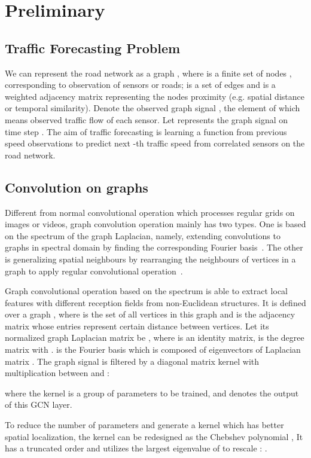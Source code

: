 \documentclass{article}
\begin{document}
\section{Preliminary}
\subsection{Traffic Forecasting Problem}
We can represent the road network as a graph , where  is a finite set of nodes , corresponding to observation of  sensors or roads;  is a set of edges and  is a weighted adjacency matrix representing the nodes proximity (e.g. spatial distance or temporal similarity). Denote the observed graph signal , the element of which means observed traffic flow of each sensor. Let  represents the graph signal on time step . The aim of traffic forecasting is learning a function  from previous  speed observations to predict next -th traffic speed from  correlated sensors on the road network. 

\subsection{Convolution on graphs}
Different from normal convolutional operation which processes regular grids on images or videos, graph convolution operation mainly has two types. One is based on the spectrum of the graph Laplacian, namely, extending convolutions to graphs in spectral domain by finding the corresponding Fourier basis~\cite{bruna2013spectral}. The other is generalizing spatial neighbours by rearranging the neighbours of vertices in a graph to apply regular convolutional operation~\cite{niepert2016learning}. 

Graph convolutional operation based on the spectrum is able to extract local features with different reception fields from non-Euclidean structures\cite{hammond2011wavelets}. It is defined over a graph , where  is the set of all vertices in this graph and  is the adjacency matrix whose entries represent certain distance between vertices. Let its normalized graph Laplacian matrix be , where  is an identity matrix,  is the degree matrix with .  is the Fourier basis which is composed of eigenvectors of Laplacian matrix . The graph signal  is filtered by a diagonal matrix kernel  with multiplication between  and :

where the kernel  is a group of parameters to be trained,  and  denotes the output of this GCN layer.

To reduce the number of parameters and generate a kernel which has better spatial localization, the kernel  can be redesigned as the Chebshev polynomial , It has a truncated order  and utilizes the largest eigenvalue of  to rescale :  \cite{defferrard2016convolutional}. 
\end{document}
